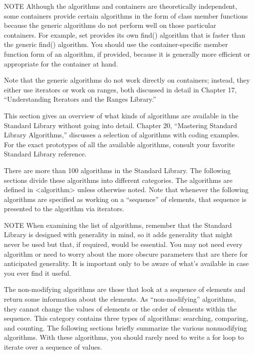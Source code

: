 \begin{myNotic}{NOTE}
Although the algorithms and containers are theoretically independent, some containers provide certain algorithms in the form of class member functions because the generic algorithms do not perform well on those particular containers. For example, set provides its own find() algorithm that is faster than the generic find() algorithm. You should use the container-specific member function form of an algorithm, if provided, because it is generally more efficient or appropriate for the container at hand.
\end{myNotic}

Note that the generic algorithms do not work directly on containers; instead, they either use iterators or work on ranges, both discussed in detail in Chapter 17, “Understanding Iterators and the Ranges Library.”

This section gives an overview of what kinds of algorithms are available in the Standard Library without going into detail. Chapter 20, “Mastering Standard Library Algorithms,” discusses a selection of algorithms with coding examples. For the exact prototypes of all the available algorithms, consult your favorite Standard Library reference.

There are more than 100 algorithms in the Standard Library. The following sections divide these algorithms into different categories. The algorithms are defined in <algorithm> unless otherwise noted. Note that whenever the following algorithms are specified as working on a “sequence” of elements, that sequence is presented to the algorithm via iterators.

\begin{myNotic}{NOTE}
When examining the list of algorithms, remember that the Standard Library is designed with generality in mind, so it adds generality that might never be used but that, if required, would be essential. You may not need every algorithm or need to worry about the more obscure parameters that are there for anticipated generality. It is important only to be aware of what’s available in case you ever find it useful.
\end{myNotic}


The non-modifying algorithms are those that look at a sequence of elements and return some information about the elements. As “non-modifying” algorithms, they cannot change the values of elements or the order of elements within the sequence. This category contains three types of algorithms: searching, comparing, and counting. The following sections briefly summarize the various nonmodifying algorithms. With these algorithms, you should rarely need to write a for loop to iterate over a sequence of values.

